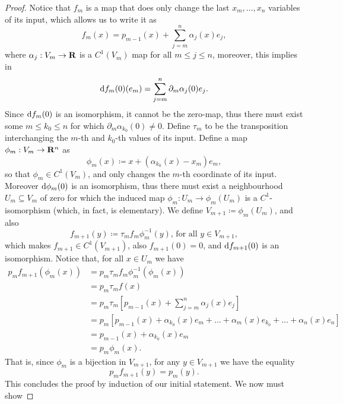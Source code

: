 \begin{proof}
    Notice that \(f_m\) is a map that does only change the last \(x_m, \dots,
    x_{n}\) variables of its input, which allows us to write it as
    \[
        f_{m}(x) = p_{m-1}(x) + \sum_{j=m}^n \alpha_j(x) e_j,
    \]
    where \(\alpha_j: V_m \to \mathbf{R}\) is a \(C^1(V_m)\) map for all \(m \leq j \leq
    n\), moreover, this implies in
    \[
        \mathrm{d} f_m(0)(e_m) = \sum_{j = m}^n \partial_{m} \alpha_j(0) e_{j}.
    \]
    Since \(\mathrm{d} f_{m}(0)\) is an isomorphism, it cannot be the zero-map, thus
    there must exist some \(m \leq k_0 \leq n\) for which \(\partial_m
    \alpha_{k_0}(0) \neq 0\). Define \(\tau_m\) to be the transposition interchanging
    the \(m\)-th and \(k_0\)-th values of its input. Define a map \(\phi_m: V_m \to
    \mathbf{R}^n\) as
    \[
        \phi_m(x) \coloneq x + (\alpha_{k_0}(x) - x_m) e_m,
    \]
    so that \(\phi_{m} \in C^1(V_m)\), and only changes the \(m\)-th coordinate of
    its input. Moreover \(\mathrm{d} \phi_m(0)\) is an isomorphism, thus there must
    exist a neighbourhood \(U_m \subseteq V_m\) of zero for which the induced map
    \(\phi_m: U_m \to \phi_m(U_m)\) is a \(C^1\)-isomorphism (which, in fact, is
    elementary). We define \(V_{m + 1} \coloneq \phi_m(U_m)\), and also
    \[
        f_{m+1}(y) \coloneq \tau_m f_m\phi^{-1}_m(y)\text{, for all } y \in V_{m+1},
    \]
    which makes \(f_{m+1} \in C^{1}(V_{m+1})\), also \(f_{m+1}(0) = 0\), and \(\mathrm{d}
    f_{m+1}(0)\) is an isomorphism. Notice that, for all \(x \in U_m\) we have
    \begin{align*}
        p_m f_{m+1}(\phi_m(x))
         & = p_m \tau_m f_m \phi_m^{-1}(\phi_m(x))                               \\
         & = p_m \tau_m f(x)                                                     \\
         & = p_m \tau_m \left[ p_{m-1}(x) + \sum_{j=m}^n \alpha_j(x) e_j \right] \\
         & = p_{m} \left[
            p_{m-1}(x) + \alpha_{k_0}(x) e_m + \dots
            + \alpha_m(x) e_{k_0} + \dots + \alpha_n(x) e_n
        \right]                                                                  \\
         & = p_{m-1}(x) + \alpha_{k_0}(x) e_m                                    \\
         & = p_m \phi_m(x).
    \end{align*}
    That is, since \(\phi_m\) is a bijection in \(V_{m+1}\), for any \(y \in
    V_{m+1}\) we have the equality
    \[
        p_m f_{m+1}(y) = p_m(y).
    \]
    This concludes the proof by induction of our initial statement. We now must show

\end{proof}

